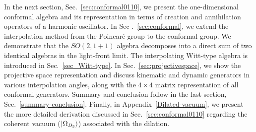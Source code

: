 \documentclass[%
 reprint,
superscriptaddress,
 amsmath,amssymb,
 aps,
]{revtex4-2}
\begin{document}
In the next section, Sec.~\ref{sec:conformal0110}, we present the one-dimensional conformal algebra and its representation in terms of creation and annihilation operators of a harmonic oscillator. In Sec .~\ref{sec:conformal}, we extend the interpolation method from the Poincar\'e group to the conformal group. We demonstrate that the $SO(2, 1 + 1)$ algebra decomposes into a direct sum of two identical algebras in the light-front limit. The interpolating Witt-type algebra is introduced in Sec.~\ref{sec_Witt-type}. 
In Sec.~\ref{sec:projectivespace}, we show the projective space representation and discuss kinematic and dynamic generators in various interpolation angles, along with the $4\times4$ matrix representation of all conformal generators. %
Summary and conclusion follow in the last section, Sec.~\ref{summary-conclusion}. Finally, in Appendix~\ref{Dilated-vacuum},  we present the more detailed derivation discussed in Sec.~\ref{sec:conformal0110} regarding the coherent vacuum ($\ket{\Omega_{D_{3}}}$) associated with the dilation. 
\end{document}
